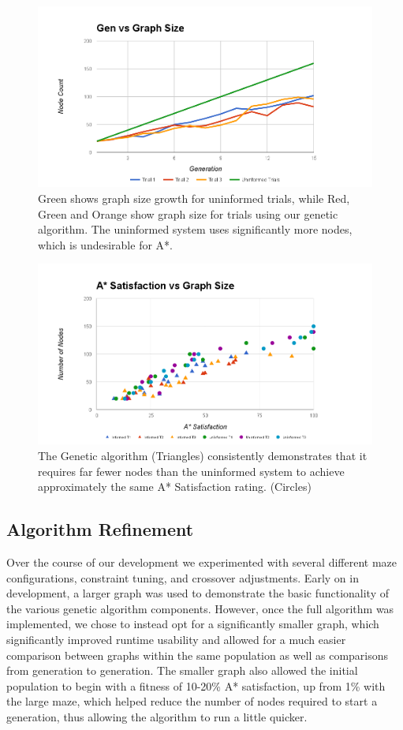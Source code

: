 	\begin{figure}
		\includegraphics[width=\textwidth]{tests/gengraphsize}
		\caption{Green shows graph size growth for uninformed trials, while Red, Green and Orange show graph size for trials using our genetic algorithm. The uninformed system uses significantly more nodes, which is undesirable for A*.}
	\end{figure}
	
	\begin{figure}
		\includegraphics[width=\textwidth]{tests/satgraphsize}
		\caption{The Genetic algorithm (Triangles) consistently demonstrates that it requires far fewer nodes than the uninformed system to achieve approximately the same A* Satisfaction rating. (Circles)}
	\end{figure}
	
	\subsection{Algorithm Refinement}
	Over the course of our development we experimented with several different maze configurations, constraint tuning, and crossover adjustments. Early on in development, a larger graph was used to demonstrate the basic functionality of the various genetic algorithm components. However, once the full algorithm was implemented, we chose to instead opt for a significantly smaller graph, which significantly improved runtime usability and allowed for a much easier comparison between graphs within the same population as well as comparisons from generation to generation. The smaller graph also allowed the initial population to begin with a fitness of 10-20\% A* satisfaction, up from 1\% with the large maze, which helped reduce the number of nodes required to start a generation, thus allowing the algorithm to run a little quicker.
	
